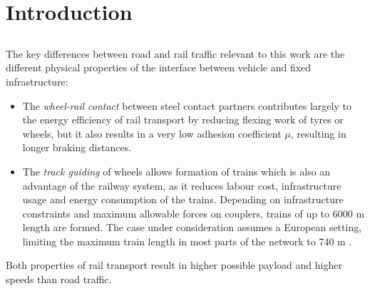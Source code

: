 \documentclass[a4paper, 12pt]{scrartcl}
\begin{document}
\section{Introduction}
\subsection{}
The key differences between road and rail traffic relevant to this work are the different physical properties of the interface between vehicle and fixed infrastructure:
\begin{itemize}
 \item The \emph{wheel-rail contact} between steel contact partners contributes largely to the energy efficiency of rail transport by reducing flexing work of tyres or wheels, but it also results in a very low adhesion coefficient $\mu$, resulting in longer braking distances. 
 \item The \emph{track guiding} of wheels allows formation of trains which is also an advantage of the railway system, as it reduces labour cost, infrastructure usage and energy consumption of the trains. Depending on infrastructure constraints and maximum allowable forces on couplers, trains of up to 6000 m length are formed. The case under consideration assumes a European setting, limiting the maximum train length in most parts of the network to 740 m \cite{tsiinf}.
\end{itemize}
Both properties of rail transport result in higher possible payload and higher speeds than road traffic.
\end{document}
